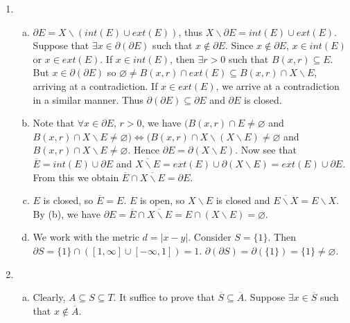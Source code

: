 \documentclass[A4paper,12pt]{article}
\theoremstyle{definition}
\numberwithin{equation}{section}
\begin{document}
\begin{enumerate}[(1)]
        \item
            \begin{enumerate}[(a)]
                \item
                    $\partial E = X \backslash (int(E) \cup ext(E))$, thus $X \backslash \partial E = int(E) \cup ext(E)$.
                    Suppose that $\exists x \in \partial(\partial E)$ such that $x \not \in \partial E$. 
                    Since $x \not \in \partial E$, $x \in int(E)$ or $x \in ext(E)$.
                    If $x \in int(E)$, then $\exists r>0$ such that $B(x, r) \subseteq E$. 
                    But $x \in \partial(\partial E)$ so $\varnothing \neq B(x,r) \cap ext(E) \subseteq B(x, r) \cap X\backslash E$, arriving at a contradiction.
                    If $x \in ext(E)$, we arrive at a contradiction in a similar manner.
                    Thus $\partial(\partial E) \subseteq \partial E$ and $\partial E$ is closed.
                \item
                    Note that $\forall x \in \partial E$, $r>0$, we have $(B(x, r) \cap E \not = \varnothing$ and $B(x, r) \cap X\backslash E \not = \varnothing) \iff (B(x, r) \cap X\backslash (X \backslash E) \not = \varnothing$ and $B(x, r) \cap X \backslash E \not = \varnothing$.
                    Hence $\partial E = \partial (X\backslash E)$.
                    Now see that $\overline{E} = int(E) \cup \partial E$ and $\overline{X\backslash E} = ext(E) \cup \partial (X \backslash E) = ext(E) \cup \partial E$. From this we obtain $\overline{E} \cap \overline{X\backslash E} = \partial E$.
                \item
                    $E$ is closed, so $\overline{E} = E$. $E$ is open, so $X \backslash E$ is closed and $\overline{E\backslash X} = E\backslash X$.
                    By (b), we have $\partial E = \overline{E} \cap \overline{X\backslash E} = E \cap (X\backslash E) = \varnothing$.
                \item
                    We work with the metric $d = |x-y|$.   
                    Consider $S = \{1\}$. Then $\partial S = \{1\} \cap ([1, \infty] \cup [-\infty, 1]) = 1$. $\partial (\partial S) = \partial(\{1\}) = \{1\} \neq \varnothing$.
            \end{enumerate}
        \item
            \begin{enumerate}[(a)]
                \item
                    Clearly, $A \subseteq S \subseteq T$. It suffice to prove that $\overline{S} \subseteq \overline{A}$. Suppose $\exists x \in \overline{S}$ such that $x \not \in \overline{A}$. 

\end{enumerate}
\end{enumerate}
\end{document}
